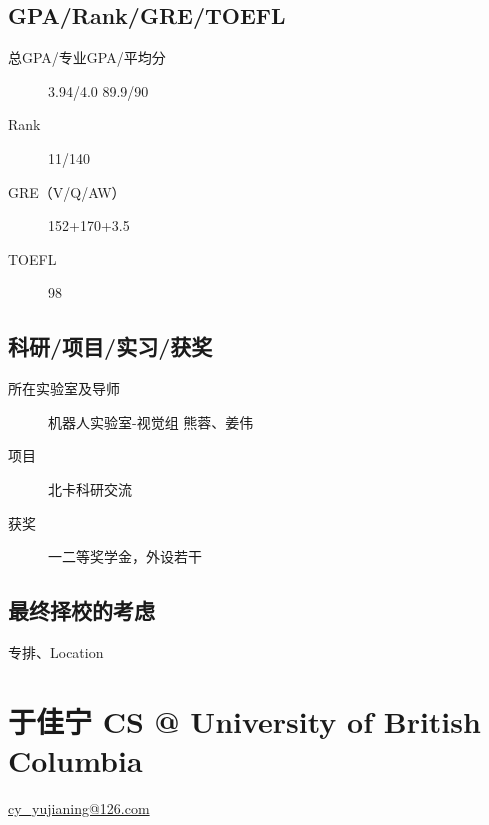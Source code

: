 \documentclass[11pt,fleqn,openany]{book} %
\begin{document}
\subsection*{GPA/Rank/GRE/TOEFL}
\begin{description}
\item[总GPA/专业GPA/平均分] 3.94/4.0  89.9/90
\item[Rank] 11/140
\item[GRE（V/Q/AW）] 152+170+3.5
\item[TOEFL] 98
\end{description}

\subsection*{科研/项目/实习/获奖}
\begin{description}
\item[所在实验室及导师] 机器人实验室-视觉组 熊蓉、姜伟
\item[项目] 北卡科研交流
\item[获奖] 一二等奖学金，外设若干
\end{description}
\subsection*{最终择校的考虑}
专排、Location
\clearpage
\section{于佳宁 CS @ University of British Columbia}
\hfill \href{mailto:cy_yujianing@126.com}{cy\_yujianing@126.com}
\end{document}

